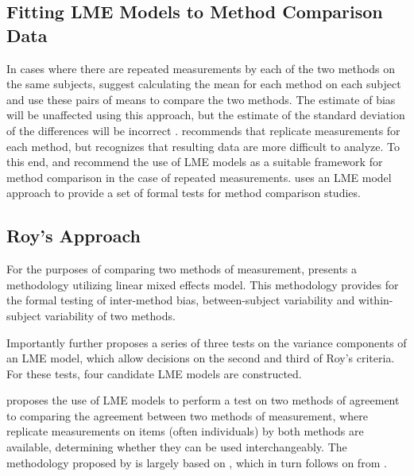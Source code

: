 \documentclass[12pt, a4paper]{report}
\theoremstyle{plain}
\theoremstyle{definition}
\theoremstyle{remark}
\begin{document}
\subsection{Fitting LME Models to Method Comparison Data}
	
	In cases where there are repeated measurements by each of the two methods on the same subjects, \citet{BA99} suggest calculating
	the mean for each method on each subject and use these pairs of means to compare the two methods. The estimate of bias will be unaffected using this approach, but the estimate of the standard deviation of the differences will be incorrect \citep{BXC2004}. \citet{BXC2004} recommends that replicate measurements for each method, but recognizes that resulting data are more difficult to analyze. To this end, \citet{BXC2004} and \citet{BXC2008} recommend the use of LME models as a suitable framework for method comparison in the case of repeated measurements.
	\citet{ARoy2009} uses an LME model approach to provide a set of formal tests for method comparison studies.
	
	
	
	
	

	\subsection{Roy's Approach}
	
		For the purposes of comparing two methods of measurement, \citet{ARoy2009} presents a methodology utilizing linear mixed effects model. This methodology provides for the formal testing of inter-method bias, between-subject variability and within-subject variability of two methods. 
			
			Importantly \citet{ARoy2009} further proposes a series of three tests on the variance components of an LME model, which allow decisions on the second and third of Roy's criteria. For these tests, four candidate LME models are constructed. 
			
	\citet{ARoy2009} proposes the use of LME models to perform a test on two methods of agreement to comparing the agreement between two methods of measurement, where replicate measurements on items (often individuals) by both methods are available, determining whether they can be used
	interchangeably. The methodology proposed by \citet{ARoy2009} is largely based on \citet{hamlett}, which in turn follows on from \citet{lam}.
	
\end{document}

